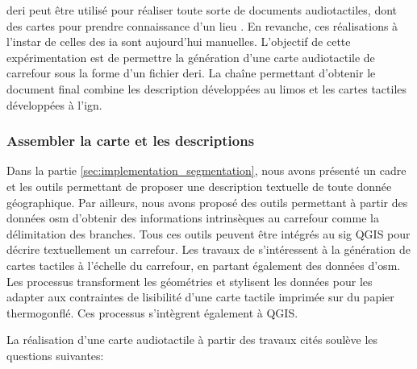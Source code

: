 \gls{deri} peut être utilisé pour réaliser toute sorte de documents audiotactiles, dont des cartes pour prendre connaissance d'un lieu \missref{}. En revanche, ces réalisations à l'instar de celles des \gls{ia} sont aujourd'hui manuelles. L'objectif de cette expérimentation est de permettre la génération d'une carte audiotactile de carrefour sous la forme d'un fichier \gls{deri}. La chaîne permettant d'obtenir le document final combine les description développées au \gls{limos} et les cartes tactiles développées à l'\gls{ign}.

\subsubsection{Assembler la carte et les descriptions}

Dans la partie \ref{sec:implementation_segmentation}, nous avons présenté un cadre et les outils permettant de proposer une description textuelle de toute donnée géographique. Par ailleurs, nous avons proposé des outils permettant à partir des données \gls{osm} d'obtenir des informations intrinsèques au carrefour comme la délimitation des branches. Tous ces outils peuvent être intégrés au \gls{sig} QGIS pour décrire textuellement un carrefour. Les travaux de \citet{Jiang2023} s'intéressent à la génération de cartes tactiles à l'échelle du carrefour, en partant également des données d'\gls{osm}. Les processus transforment les géométries et stylisent les données pour les adapter aux contraintes de lisibilité d'une carte tactile imprimée sur du papier thermogonflé. Ces processus s'intègrent également à QGIS.

\newpar{}

La réalisation d'une carte audiotactile à partir des travaux cités soulève les questions suivantes:

